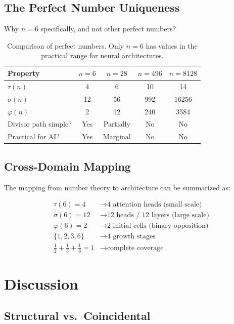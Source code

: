 \documentclass[12pt]{article}
\begin{document}
\subsection{The Perfect Number Uniqueness}

Why $n = 6$ specifically, and not other perfect numbers?

\begin{table}[h]
\centering
\begin{tabular}{lcccc}
\toprule
Property & $n=6$ & $n=28$ & $n=496$ & $n=8128$ \\
\midrule
$\tau(n)$ & 4 & 6 & 10 & 14 \\
$\sigma(n)$ & 12 & 56 & 992 & 16256 \\
$\varphi(n)$ & 2 & 12 & 240 & 3584 \\
Divisor path simple? & Yes & Partially & No & No \\
Practical for AI? & Yes & Marginal & No & No \\
\bottomrule
\end{tabular}
\caption{Comparison of perfect numbers. Only $n=6$ has values in the practical range for neural architectures.}
\label{tab:perfect}
\end{table}

\subsection{Cross-Domain Mapping}

The mapping from number theory to architecture can be summarized as:

\begin{align}
\tau(6) = 4 &\longrightarrow \text{4 attention heads (small scale)} \\
\sigma(6) = 12 &\longrightarrow \text{12 heads / 12 layers (large scale)} \\
\varphi(6) = 2 &\longrightarrow \text{2 initial cells (binary opposition)} \\
\{1,2,3,6\} &\longrightarrow \text{4 growth stages} \\
\tfrac{1}{2}+\tfrac{1}{3}+\tfrac{1}{6} = 1 &\longrightarrow \text{complete coverage}
\end{align}

\section{Discussion}

\subsection{Structural vs.\ Coincidental}
\end{document}
